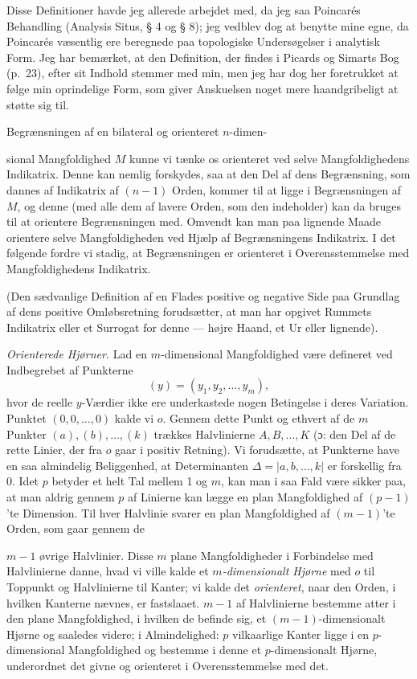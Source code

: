 \documentclass{article}
\begin{document}
Disse Definitioner havde jeg allerede arbejdet med, da jeg saa Poincarés Behandling (Analysis Situs, § 4 og § 8); jeg vedblev dog at benytte mine egne, da Poincarés væsentlig ere beregnede paa topologiske Undersøgelser i analytisk Form. Jeg har bemærket, at den Definition, der findes i Picards og Simarts Bog (p.\ 23), efter sit Indhold stemmer med min, men jeg har dog her foretrukket at følge min oprindelige Form, som giver Anskuelsen noget mere haandgribeligt at støtte sig til.

Begrænsningen af en bilateral og orienteret $n$-dimen-

sional Mangfoldighed $M$ kunne vi tænke os orienteret ved selve Mangfoldighedens Indikatrix. Denne kan nemlig forskydes, saa at den Del af dens Begrænsning, som dannes af Indikatrix af $(n - 1)$ Orden, kommer til at ligge i Begrænsningen af $M$, og denne (med alle dem af lavere Orden, som den indeholder) kan da bruges til at orientere Begrænsningen med. Omvendt kan man paa lignende Maade orientere selve Mangfoldigheden ved Hjælp af Begrænsningens Indikatrix. I det følgende fordre vi stadig, at Begrænsningen er orienteret i Overensstemmelse med Mangfoldighedens Indikatrix.

(Den sædvanlige Definition af en Flades positive og negative Side paa Grundlag af dens positive Omløbsretning forudsætter, at man har opgivet Rummets Indikatrix eller et Surrogat for denne --- højre Haand, et Ur eller lignende).

\emph{Orienterede Hjørner.} Lad en $m$-dimensional Mangfoldighed være defineret ved Indbegrebet af Punkterne
\[
(y) = (y_1, y_2, \dots, y_m),
\]
hvor de reelle $y$-Værdier ikke ere underkastede nogen Betingelse i deres Variation. Punktet $(0, 0, \dots, 0)$ kalde vi $o$. Gennem dette Punkt og ethvert af de $m$ Punkter $(a), (b), \dots, (k)$ trækkes Halvlinierne $A, B, \dots, K$ (ɔ: den Del af de rette Linier, der fra $o$ gaar i positiv Retning). Vi forudsætte, at Punkterne have en saa almindelig Beliggenhed, at Determinanten $\Delta = |a, b, \dots, k|$ er forskellig fra 0. Idet $p$ betyder et helt Tal mellem 1 og $m$, kan man i saa Fald være sikker paa, at man aldrig gennem $p$ af Linierne kan lægge en plan Mangfoldighed af $(p - 1)$'te Dimension. Til hver Halvlinie svarer en plan Mangfoldighed af $(m - 1)$'te Orden, som gaar gennem de

$m - 1$ øvrige Halvlinier. Disse $m$ plane Mangfoldigheder i Forbindelse med Halvlinierne danne, hvad vi ville kalde et \emph{$m$-dimensionalt Hjørne} med $o$ til Toppunkt og Halvlinierne til Kanter; vi kalde det \emph{orienteret}, naar den Orden, i hvilken Kanterne nævnes, er fastslaaet. $m - 1$ af Halvlinierne bestemme atter i den plane Mangfoldighed, i hvilken de befinde sig, et $(m - 1)$-dimensionalt Hjørne og saaledes videre; i Almindelighed: $p$ vilkaarlige Kanter ligge i en $p$-dimensional Mangfoldighed og bestemme i denne et $p$-dimensionalt Hjørne, underordnet det givne og orienteret i Overensstemmelse med det.
\end{document}
